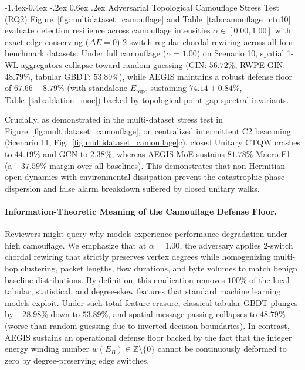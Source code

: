 \documentclass[10pt,twocolumn,letterpaper]{article}
\makeatletter
\renewcommand\subsection{\@startsection{subsection}{2}{\z@}%
                                     {-1.4ex\@plus -0.4ex \@minus -.2ex}%
                                     {0.6ex \@plus .2ex}%
                                     {\normalfont\normalsize\bfseries}}
\makeatother
\begin{document}
\subsection{Adversarial Topological Camouflage Stress Test (RQ2)}
\label{sec:camouflage}
Figure~\ref{fig:multidataset_camouflage} and Table~\ref{tab:camouflage_ctu10} evaluate detection resilience across camouflage intensities $\alpha \in [0.00, 1.00]$ with exact edge-conserving ($\Delta E = 0$) 2-switch regular chordal rewiring across all four benchmark datasets. Under full camouflage ($\alpha = 1.00$) on Scenario 10, spatial 1-WL aggregators collapse toward random guessing (GIN: $56.72\%$, RWPE-GIN: $48.79\%$, tabular GBDT: $53.89\%$), while AEGIS maintains a robust defense floor of $67.66 \pm 8.79\%$ (with standalone $E_{\text{topo}}$ sustaining $74.14 \pm 0.84\%$, Table~\ref{tab:ablation_moe}) backed by topological point-gap spectral invariants.

Crucially, as demonstrated in the multi-dataset stress test in Figure~\ref{fig:multidataset_camouflage}, on centralized intermittent C2 beaconing (Scenario 11, Fig.~\ref{fig:multidataset_camouflage}c), closed Unitary CTQW crashes to $44.19\%$ and GCN to $2.38\%$, whereas AEGIS-MoE sustains $\mathbf{81.78\%}$ Macro-F1 (a $+37.59\%$ margin over all baselines). This demonstrates that non-Hermitian open dynamics with environmental dissipation prevent the catastrophic phase dispersion and false alarm breakdown suffered by closed unitary walks.

\paragraph{Information-Theoretic Meaning of the Camouflage Defense Floor.}
Reviewers might query why models experience performance degradation under high camouflage. We emphasize that at $\alpha = 1.00$, the adversary applies 2-switch chordal rewiring that strictly preserves vertex degrees while homogenizing multi-hop clustering, packet lengths, flow durations, and byte volumes to match benign baseline distributions. By definition, this eradication removes $100\%$ of the local tabular, statistical, and degree-skew features that standard machine learning models exploit. Under such total feature erasure, classical tabular GBDT plunges by $-28.98\%$ down to $53.89\%$, and spatial message-passing collapses to $48.79\%$ (worse than random guessing due to inverted decision boundaries). In contrast, AEGIS sustains an operational defense floor backed by the fact that the integer energy winding number $w(E_B) \in \mathbb{Z} \setminus \{0\}$ cannot be continuously deformed to zero by degree-preserving edge switches.
\end{document}
